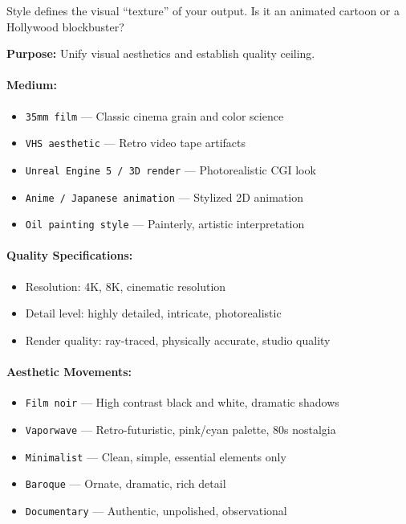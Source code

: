 Style defines the visual ``texture'' of your output. Is it an animated cartoon or a Hollywood blockbuster?

\textbf{Purpose:} Unify visual aesthetics and establish quality ceiling.

\paragraph{Medium:}
\begin{itemize}
    \item \texttt{35mm film} --- Classic cinema grain and color science
    \item \texttt{VHS aesthetic} --- Retro video tape artifacts
    \item \texttt{Unreal Engine 5 / 3D render} --- Photorealistic CGI look
    \item \texttt{Anime / Japanese animation} --- Stylized 2D animation
    \item \texttt{Oil painting style} --- Painterly, artistic interpretation
\end{itemize}

\paragraph{Quality Specifications:}
\begin{itemize}
    \item Resolution: 4K, 8K, cinematic resolution
    \item Detail level: highly detailed, intricate, photorealistic
    \item Render quality: ray-traced, physically accurate, studio quality
\end{itemize}

\paragraph{Aesthetic Movements:}
\begin{itemize}
    \item \texttt{Film noir} --- High contrast black and white, dramatic shadows
    \item \texttt{Vaporwave} --- Retro-futuristic, pink/cyan palette, 80s nostalgia
    \item \texttt{Minimalist} --- Clean, simple, essential elements only
    \item \texttt{Baroque} --- Ornate, dramatic, rich detail
    \item \texttt{Documentary} --- Authentic, unpolished, observational
\end{itemize}

